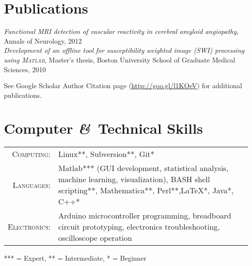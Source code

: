 \documentclass[letterpaper,11pt]{article}
\newcommand{\amper}{{\fontspec[Scale=.95]{Hoefler Text}\selectfont\itshape\&}}
\begin{document}
\section{Publications}
\emph{Functional MRI detection of vascular reactivity in cerebral amyloid angiopathy}, Annals of Neurology, 2012\\
\emph{Development of an offline tool for susceptibility weighted image (SWI) processing using \textsc{Matlab}}, Master's thesis, Boston University School of Graduate Medical Sciences, 2010

\footnotesize{See Google Scholar Author Citation page (\url{http://goo.gl/l1KOeV}) for additional publications.}


\section{\texorpdfstring{Computer \amper \ Technical Skills}{Computer and Technical Skills}}
\begin{tabularx}{\textwidth}{rX}
\textsc{Computing:} & Linux**, Subversion**, Git* \\
\textsc{Languages:} & Matlab*** (GUI development, statistical analysis, machine learning, visualization), BASH shell scripting**, Mathematica**, Perl**,\LaTeX**, Java*, C++*\\
\textsc{Electronics:} & Arduino microcontroller programming, breadboard circuit prototyping, electronics troubleshooting, oscilloscope operation\\
\end{tabularx}

\vspace{0.3cm}
\tiny{*** = Expert, ** = Intermediate, * = Beginner}
\end{document}
